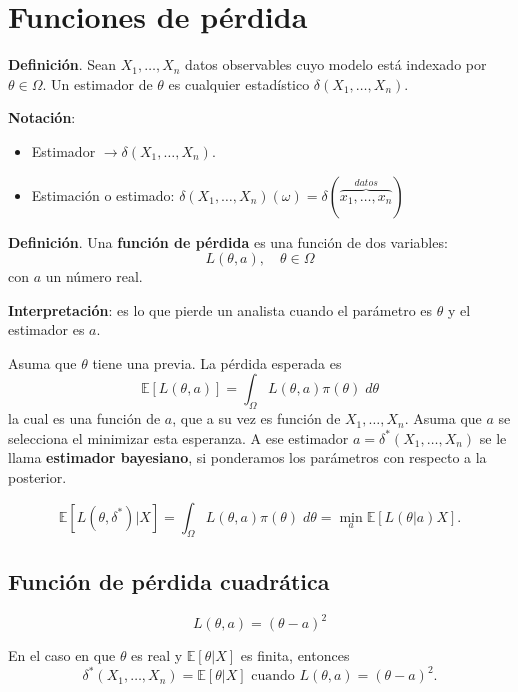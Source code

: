 \documentclass[
  12pt,
]{book}
\providecommand{\tightlist}{%
  \setlength{\itemsep}{0pt}\setlength{\parskip}{0pt}}
\begin{document}
\hypertarget{funciones-de-puxe9rdida}{%
\section{Funciones de pérdida}\label{funciones-de-puxe9rdida}}

\textbf{Definición}. Sean \(X_1,\dots, X_n\) datos observables cuyo modelo está indexado por \(\theta\in\Omega\). Un estimador de \(\theta\) es cualquier estadístico \(\delta(X_1,\dots, X_n)\).

\textbf{Notación}:

\begin{itemize}
\tightlist
\item
  Estimador \(\to \delta(X_1,\dots,X_n)\).
\item
  Estimación o estimado: \(\delta(X_1,\dots,X_n)(\omega) = \delta(\overbrace{x_1,\dots,x_n}^{datos})\)
\end{itemize}

\textbf{Definición}. Una \textbf{función de pérdida} es una función de dos variables:
\[ L(\theta,a), \quad \theta \in\Omega\]
con \(a\) un número real.

\textbf{Interpretación}: es lo que pierde un analista cuando el parámetro es \(\theta\) y el estimador es \(a\).

Asuma que \(\theta\) tiene una previa. La pérdida esperada es
\[ \mathbb{E}[L(\theta,a)] = \int_{\Omega}L(\theta, a) \pi(\theta)\;d\theta\]
la cual es una función de \(a\), que a su vez es función de \(X_1,\dots,X_n\). Asuma que \(a\) se selecciona el minimizar esta esperanza. A ese estimador \(a = \delta^*(X_1,\dots, X_n)\) se le llama \textbf{estimador bayesiano}, si ponderamos los parámetros con respecto a la posterior.

\[\mathbb{E}[L(\theta, \delta^*)|X] = \int_{\Omega}L(\theta, a) \pi(\theta)\;d\theta = \min_a \mathbb{E}[L(\theta|a)X]. \]

\hypertarget{funciuxf3n-de-puxe9rdida-cuadruxe1tica}{%
\subsection{Función de pérdida cuadrática}\label{funciuxf3n-de-puxe9rdida-cuadruxe1tica}}

\[ L(\theta, a) = (\theta-a)^2\]

En el caso en que \(\theta\) es real y \(\mathbb{E}[\theta|X]\) es finita, entonces
\[ \delta^*(X_1,\dots, X_n) = \mathbb{E}[\theta|X] \text{ cuando } L(\theta,a) = (\theta-a)^2. \]
\end{document}

